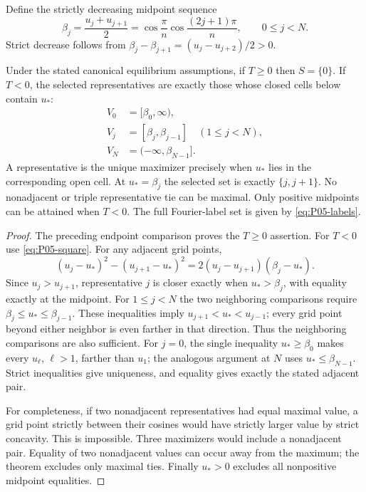 Define the strictly decreasing midpoint sequence
\begin{equation}
 \beta_j=\frac{u_j+u_{j+1}}2
 =\cos\frac\pi n\cos\frac{(2j+1)\pi}{n},\qquad 0\le j<N.
 \label{eq:P05-midpoints}
\end{equation}
Strict decrease follows from
$\beta_j-\beta_{j+1}=(u_j-u_{j+2})/2>0$.

\begin{theorem}
\label{thm:P05-selection}
Under the stated canonical equilibrium assumptions, if $T\ge0$ then
$S=\{0\}$. If $T<0$, the selected representatives are exactly those
whose closed cells below contain $u_*$:
\begin{align}
 V_0&=[\beta_0,\infty),\label{eq:P05-cells}\\
 V_j&=[\beta_j,\beta_{j-1}]\quad(1\le j<N),\nonumber\\
 V_N&=(-\infty,\beta_{N-1}].\nonumber
\end{align}
A representative is the unique maximizer precisely when $u_*$ lies in
the corresponding open cell. At $u_*=\beta_j$ the selected set is
exactly $\{j,j+1\}$. No nonadjacent or triple representative tie can
be maximal. Only positive midpoints can be attained when $T<0$.
The full Fourier-label set is given by \eqref{eq:P05-labels}.
\end{theorem}
\begin{proof}
The preceding endpoint comparison proves the $T\ge0$ assertion.
For $T<0$ use \eqref{eq:P05-square}. For any adjacent grid points,
\[
 (u_j-u_*)^2-(u_{j+1}-u_*)^2
       =2(u_j-u_{j+1})(\beta_j-u_*).
\]
Since $u_j>u_{j+1}$, representative $j$ is closer exactly when
$u_*>\beta_j$, with equality exactly at the midpoint.
For $1\le j<N$ the two neighboring comparisons require
$\beta_j\le u_*\le\beta_{j-1}$. These inequalities imply
$u_{j+1}<u_*<u_{j-1}$; every grid point beyond either neighbor is
even farther in that direction. Thus the neighboring comparisons are
also sufficient. For $j=0$, the single inequality $u_*\ge\beta_0$
makes every $u_\ell$, $\ell>1$, farther than $u_1$; the analogous
argument at $N$ uses $u_*\le\beta_{N-1}$. Strict inequalities give
uniqueness, and equality gives exactly the stated adjacent pair.

For completeness, if two nonadjacent representatives had equal maximal
value, a grid point strictly between their cosines would have strictly
larger value by strict concavity. This is impossible. Three maximizers
would include a nonadjacent pair. Equality of two nonadjacent values
can occur away from the maximum; the theorem excludes only maximal ties.
Finally $u_*>0$ excludes all nonpositive midpoint equalities.
\end{proof}

